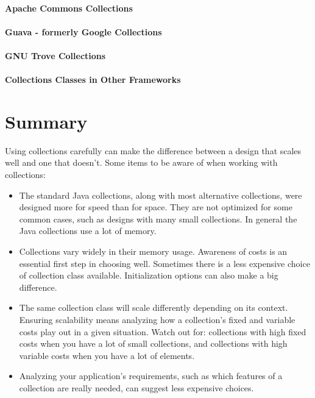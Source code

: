 \paragraph{Apache Commons Collections}

\paragraph{Guava - formerly Google Collections}

\paragraph{GNU Trove Collections}

\paragraph{Collections Classes in Other Frameworks}

\section{Summary}
Using collections carefully can
make the difference between a design that scales well and one that
doesn't. Some items to be aware of when working with collections:
\begin{itemize}
  \item The standard Java collections, along with most alternative
  collections, were designed more for speed than for space. They are
  not optimized for some common cases, such as designs with many small
  collections. In general the Java collections use a lot of memory.
  \item Collections vary widely in their memory usage. Awareness of
  costs is an essential first step in choosing well. Sometimes there is a less
  expensive choice of collection class available. Initialization options
  can also make a big difference.
  \item The same collection class will scale differently depending on its
  context. Ensuring scalability means
  analyzing how a collection's fixed and variable costs
  play out in a given situation. Watch out for: collections with
  high fixed costs when you have a lot of small collections, and 
  collections with high variable costs when you have a
  lot of elements.
  \item Analyzing your application's requirements, such as 
  which features of a collection are really needed, can suggest
  less expensive choices.
\end{itemize}
